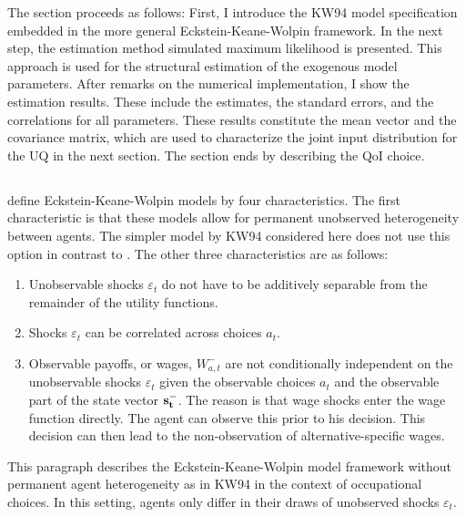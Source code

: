 The section proceeds as follows: First, I introduce the  KW94 model specification embedded in the more general Eckstein-Keane-Wolpin framework. In the next step, the estimation method simulated maximum likelihood is presented. This approach is used for the structural estimation of the exogenous model parameters. After remarks on the numerical implementation, I show the estimation results. These include the estimates, the standard errors, and the correlations for all parameters. These results constitute the mean vector and the covariance matrix, which are used to characterize the joint input distribution for the UQ in the next section. The section ends by describing the QoI choice.

\subsection{\cite{Keane.1994}}

\cite{Aguirregabiria.2010} define Eckstein-Keane-Wolpin models by four characteristics. The first characteristic is that these models allow for permanent unobserved heterogeneity between agents. The simpler model by KW94 considered here does not use this option in contrast to \cite{Keane.1997}. The other three characteristics are as follows:
\begin{enumerate}
	\item Unobservable shocks $\varepsilon_t$ do not have to be additively separable from the remainder of the utility functions.
	\item Shocks $\varepsilon_t$ can be correlated across choices $a_t$.
	\item Observable payoffs, or wages, $W_{a,t}^{-}$ are not conditionally independent on the unobservable shocks $\varepsilon_t$ given the observable choices $a_t$ and the observable part of the state vector $\bold{s_t^-}$. The reason is that wage shocks enter the wage function directly. The agent can observe this prior to his decision. This decision can then lead to the non-observation of alternative-specific wages. 
\end{enumerate}

\noindent
This paragraph describes the Eckstein-Keane-Wolpin model framework without permanent agent heterogeneity as in KW94 in the context of occupational choices. In this setting, agents only differ in their draws of unobserved shocks $\varepsilon_t$.

